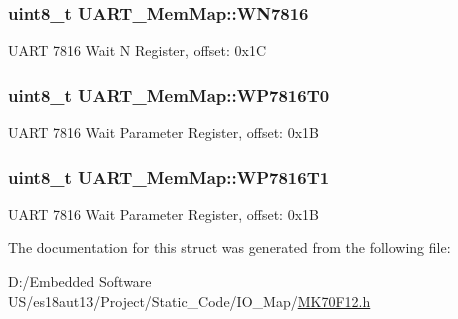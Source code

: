 \subsubsection[{W\+N7816}]{\setlength{\rightskip}{0pt plus 5cm}uint8\+\_\+t U\+A\+R\+T\+\_\+\+Mem\+Map\+::\+W\+N7816}\label{struct_u_a_r_t___mem_map_aed09f864d4f1afe57f146ff72949c3d2}
U\+A\+R\+T 7816 Wait N Register, offset\+: 0x1\+C \hypertarget{struct_u_a_r_t___mem_map_a4555ab88b0e4f56c44b30d549b5b0666}{}
\subsubsection[{W\+P7816\+T0}]{\setlength{\rightskip}{0pt plus 5cm}uint8\+\_\+t U\+A\+R\+T\+\_\+\+Mem\+Map\+::\+W\+P7816\+T0}\label{struct_u_a_r_t___mem_map_a4555ab88b0e4f56c44b30d549b5b0666}
U\+A\+R\+T 7816 Wait Parameter Register, offset\+: 0x1\+B \hypertarget{struct_u_a_r_t___mem_map_a7d456ca4a3be9b4c083253fe2d30d404}{}
\subsubsection[{W\+P7816\+T1}]{\setlength{\rightskip}{0pt plus 5cm}uint8\+\_\+t U\+A\+R\+T\+\_\+\+Mem\+Map\+::\+W\+P7816\+T1}\label{struct_u_a_r_t___mem_map_a7d456ca4a3be9b4c083253fe2d30d404}
U\+A\+R\+T 7816 Wait Parameter Register, offset\+: 0x1\+B 

The documentation for this struct was generated from the following file\+:\begin{DoxyCompactItemize}
\item 
D\+:/\+Embedded Software U\+S/es18aut13/\+Project/\+Static\+\_\+\+Code/\+I\+O\+\_\+\+Map/\hyperlink{_m_k70_f12_8h}{M\+K70\+F12.\+h}\end{DoxyCompactItemize}
